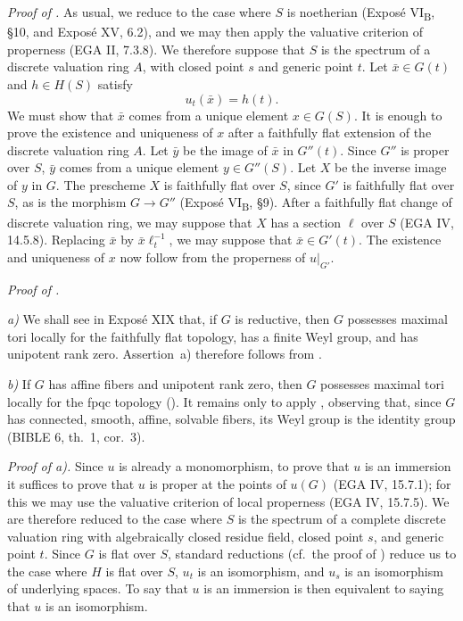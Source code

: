 \smallskip
\noindent\textit{Proof of .}
As usual, we reduce to the case where \(S\) is noetherian (Exposé
VI\textsubscript{B}, \S10, and Exposé XV, 6.2), and we may then apply
the valuative criterion of properness (EGA II, 7.3.8). We therefore
suppose that \(S\) is the spectrum of a discrete valuation ring
\(A\), with closed point \(s\) and generic point \(t\). Let
\(\bar x\in G(t)\) and \(h\in H(S)\) satisfy
\[
  u_t(\bar x)=h(t).
\]
We must show that \(\bar x\) comes from a unique element
\(x\in G(S)\). It is enough to prove the existence and uniqueness of
\(x\) after a faithfully flat extension of the discrete valuation
ring \(A\). Let \(\bar y\) be the image of \(\bar x\) in \(G''(t)\).
Since \(G''\) is proper over \(S\), \(\bar y\) comes from a unique
element \(y\in G''(S)\). Let \(X\) be the inverse image of \(y\) in
\(G\). The prescheme \(X\) is faithfully flat over \(S\), since
\(G'\) is faithfully flat over \(S\), as is the morphism
\(G\to G''\) (Exposé VI\textsubscript{B}, \S9). After a faithfully
flat change of discrete valuation ring, we may suppose that \(X\)
has a section \(\ell\) over \(S\) (EGA IV, 14.5.8). Replacing
\(\bar x\) by \(\bar x\ell_t^{-1}\), we may suppose that
\(\bar x\in G'(t)\). The existence and uniqueness of \(x\) now
follow from the properness of \(u|_{G'}\).

\medskip
\noindent\textit{Proof of .}

\smallskip
\noindent\textit{a)}
We shall see in Exposé XIX that, if \(G\) is reductive, then \(G\)
possesses maximal tori locally for the faithfully flat topology, has
a finite Weyl group, and has unipotent rank zero. Assertion~a)
therefore follows from .

\smallskip
\noindent\textit{b)}
If \(G\) has affine fibers and unipotent rank zero, then \(G\)
possesses maximal tori locally for the fpqc topology (). It remains only to apply , observing that, since \(G\) has
connected, smooth, affine, solvable fibers, its Weyl group is the
identity group (BIBLE 6, th.~1, cor.~3).

\medskip
\noindent\textit{Proof of  a).}
Since \(u\) is already a monomorphism, to prove that \(u\) is an
immersion it suffices to prove that \(u\) is proper at the points of
\(u(G)\) (EGA IV, 15.7.1); for this we may use the valuative
criterion of local properness (EGA IV, 15.7.5). We are therefore
reduced to the case where \(S\) is the spectrum of a complete
discrete valuation ring with algebraically closed residue field,
closed point \(s\), and generic point \(t\). Since \(G\) is flat over
\(S\), standard reductions (cf.\ the proof of )
reduce us to the case where \(H\) is flat over \(S\), \(u_t\) is an
isomorphism, and \(u_s\) is an isomorphism of underlying spaces. To
say that \(u\) is an immersion is then equivalent to saying that
\(u\) is an isomorphism.

